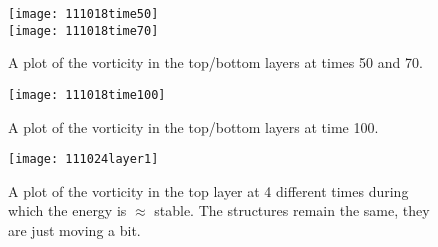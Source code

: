 \begin{description}
\begin{figure}[t]
\begin{center}
    \texttt{[image: 111018time50]}
    \\
    \texttt{[image: 111018time70]}
\end{center}
\caption{
A plot of the vorticity in the top/bottom layers at times 50 and 70.
        }
\label{f:111018time1}
\end{figure}

\begin{figure}[t]
\begin{center}
    \texttt{[image: 111018time100]}
\end{center}
\caption{
A plot of the vorticity in the top/bottom layers at time 100.
        }
\label{f:111018time2}
\end{figure}

\begin{figure}[t]
\begin{center}
    \texttt{[image: 111024layer1]}
\end{center}
\caption{
A plot of the vorticity in the top layer at 4 different times during
which the energy is $\approx$ stable. The structures remain the same,
they are just moving a bit.
        }
\label{f:111024layer1}
\end{figure}




\end{description}
